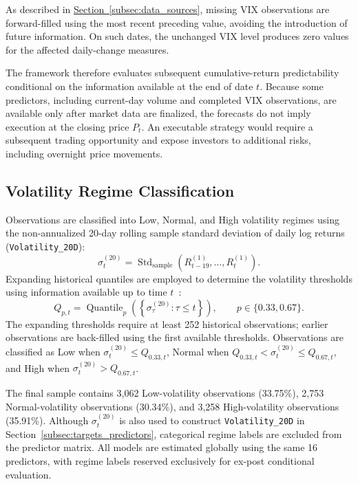 \documentclass[runningheads,orivec]{llncs}
\begin{document}
As described in \hyperref[subsec:data_sources]{Section~\ref*{subsec:data_sources}}, missing VIX observations are forward-filled using the most recent preceding value, avoiding the introduction of future information. On such dates, the unchanged VIX level produces zero values for the affected daily-change measures.

The framework therefore evaluates subsequent cumulative-return predictability conditional on the information available at the end of date $t$. Because some predictors, including current-day volume and completed VIX observations, are available only after market data are finalized, the forecasts do not imply execution at the closing price $P_t$. An executable strategy would require a subsequent trading opportunity and expose investors to additional risks, including overnight price movements.

\subsection{Volatility Regime Classification}\label{subsec:regime_classification}

Observations are classified into Low, Normal, and High volatility regimes using the non-annualized 20-day rolling sample standard deviation of daily log returns (\texttt{Volatility\_20D}):
\begin{equation}\label{eq:volatility}
\sigma_t^{(20)} = \operatorname{Std}_{\mathrm{sample}}\left(R_{t-19}^{(1)}, \dots, R_t^{(1)}\right).
\end{equation}
Expanding historical quantiles are employed to determine the volatility thresholds using information available up to time $t$~\cite{feng2024}:
\begin{equation}\label{eq:quantiles}
Q_{p,t} = \operatorname{Quantile}_p\left(\left\{\sigma_\tau^{(20)} : \tau \le t\right\}\right), \qquad p \in \{0.33, 0.67\}.
\end{equation}
The expanding thresholds require at least 252 historical observations; earlier observations are back-filled using the first available thresholds. Observations are classified as Low when $\sigma_t^{(20)} \le Q_{0.33,t}$, Normal when $Q_{0.33,t} < \sigma_t^{(20)} \le Q_{0.67,t}$, and High when $\sigma_t^{(20)} > Q_{0.67,t}$.

The final sample contains 3,062 Low-volatility observations (33.75\%), 2,753 Normal-volatility observations (30.34\%), and 3,258 High-volatility observations (35.91\%). Although $\sigma_t^{(20)}$ is also used to construct \texttt{Volatility\_20D} in Section~\ref{subsec:targets_predictors}, categorical regime labels are excluded from the predictor matrix. All models are estimated globally using the same 16 predictors, with regime labels reserved exclusively for ex-post conditional evaluation.
\end{document}
